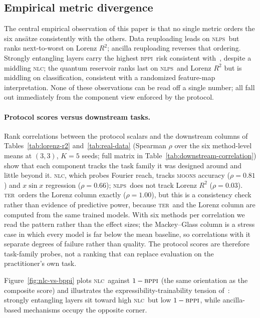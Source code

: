 \documentclass{article}
\newcommand{\nlc}{\textsc{nlc}}
\newcommand{\bppi}{\textsc{bppi}}
\newcommand{\ter}{\textsc{ter}}
\newcommand{\nlps}{\textsc{nlps}}
\begin{document}
\subsection{Empirical metric divergence}
\label{sec:metric-divergence}

The central empirical observation of this paper is that no single metric orders the six ans\"atze consistently with the others.
Data reuploading leads on \nlps\ but ranks next-to-worst on Lorenz $R^2$; ancilla reuploading reverses that ordering.
Strongly entangling layers carry the highest \bppi\ risk consistent with~\citet{holmes2022connecting}, despite a middling \nlc; the quantum reservoir ranks last on \nlps\ and Lorenz $R^2$ but is middling on classification, consistent with a randomized feature-map interpretation.
None of these observations can be read off a single number; all fall out immediately from the component view enforced by the protocol.

\paragraph{Protocol scores versus downstream tasks.}
Rank correlations between the protocol scalars and the downstream columns of Tables~\ref{tab:lorenz-r2} and~\ref{tab:real-data} (Spearman $\rho$ over the six method-level means at $(3,3)$, $K=5$ seeds; full matrix in Table~\ref{tab:downstream-correlation}) show that each component tracks the task family it was designed around and little beyond it.
\nlc, which probes Fourier reach, tracks \textsc{moons} accuracy ($\rho = 0.81$) and $x\sin x$ regression ($\rho = 0.66$); \nlps\ does not track Lorenz $R^2$ ($\rho = 0.03$).
\ter\ orders the Lorenz column exactly ($\rho = 1.00$), but this is a consistency check rather than evidence of predictive power, because \ter\ and the Lorenz column are computed from the same trained models.
With six methods per correlation we read the pattern rather than the effect sizes; the Mackey--Glass column is a stress case in which every model is far below the mean baseline, so correlations with it separate degrees of failure rather than quality.
The protocol scores are therefore task-family probes, not a ranking that can replace evaluation on the practitioner's own task.

Figure~\ref{fig:nlc-vs-bppi} plots \nlc\ against $1 - \bppi$ (the same orientation as the composite score) and illustrates the expressibility-trainability tension of~\citet{holmes2022connecting}: strongly entangling layers sit toward high \nlc\ but low $1-\bppi$, while ancilla-based mechanisms occupy the opposite corner.
\end{document}
